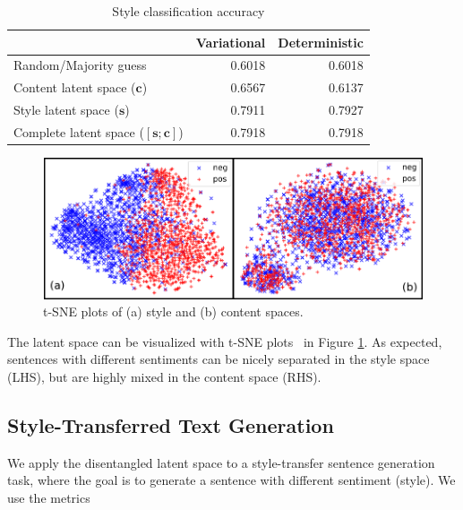 \begin{table}[ht]
	\centering
	\begin{tabular}{| l | r | r |}
		\hline
		                                        & \textbf{Variational} & \textbf{Deterministic} \\
		\hline \hline
		Random/Majority guess                   & 0.6018               & 0.6018                 \\ \hline \hline
		Content latent space  ($\bm c$)         & 0.6567               & 0.6137                 \\ \hline
		Style latent space ($\bm s$)            & 0.7911               & 0.7927                 \\ \hline
		Complete latent space ($[\bm s;\bm c]$) & 0.7918               & 0.7918                 \\
		\hline
	\end{tabular}
	\caption{Style classification accuracy}
	\label{tab:latent-space-classification}
\end{table}


\begin{figure}
	\includegraphics[width=\linewidth]{images/tsne-style-and-content}
	\caption{t-SNE plots of (a) style and (b) content spaces.}
	\label{fig:tsne}
\end{figure}


The latent space can be visualized with t-SNE plots~\cite{maaten2008visualizing} in Figure \ref{fig:tsne}. As expected, sentences with different sentiments can be nicely separated in the style space (LHS), but are highly mixed in the content space (RHS).


\subsection{Style-Transferred Text Generation}

We apply the disentangled latent space to a style-transfer sentence generation task, where the goal is to generate a sentence with different sentiment (style). We use the metrics

